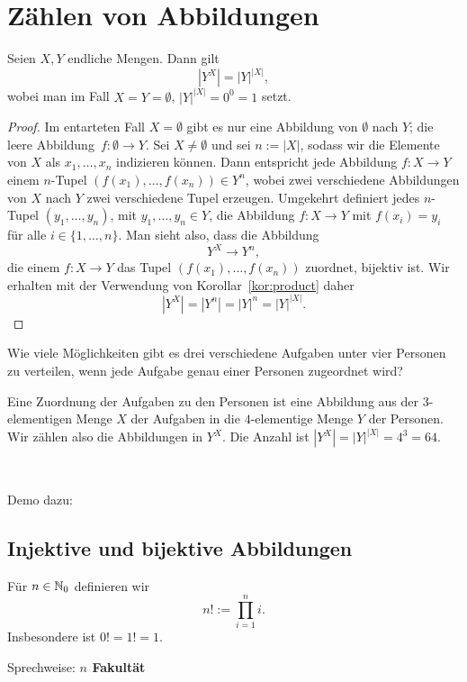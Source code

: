 \section{Zählen von Abbildungen} 

\begin{thm}
	Seien $X,Y $ endliche Mengen. Dann gilt
	\[
	|Y^X| = |Y|^{|X|},
	\]
	wobei man im Fall $X= Y = \emptyset$, $|Y|^{|X|} = 0^0 = 1$ setzt. 
\end{thm}
\begin{proof}
	Im entarteten Fall $X = \emptyset$ gibt es nur eine Abbildung von $\emptyset$ nach $Y$; die \glqq leere Abbildung\grqq\ $f : \emptyset \to Y$. 
	Sei $X \ne\emptyset$ und sei $n := |X|$, sodass wir die Elemente von $X$ als $x_1,\ldots,x_n$ indizieren können. Dann entspricht jede Abbildung $f : X \to Y$ einem $n$-Tupel $(f(x_1),\ldots,f(x_n)) \in Y^n$, wobei zwei verschiedene Abbildungen von $X$ nach $Y$ zwei verschiedene Tupel erzeugen. 
	Umgekehrt definiert jedes $n$-Tupel $(y_1,\ldots,y_n)$, mit $y_1,\ldots,y_n \in Y$, die Abbildung $f: X \to Y$ mit $f(x_i)  = y_i$ für alle $i \in \{1,\ldots,n\}$. Man sieht also, dass die Abbildung 
	\[
			Y^X \to Y^n,
	\]
	die einem $f : X \to Y$ das Tupel $(f(x_1),\ldots,f(x_n))$ zuordnet, bijektiv ist. Wir erhalten mit der Verwendung von Korollar~\ref{kor:product} daher
	\[
			|Y^X| = |Y^n| = |Y|^n = |Y|^{|X|}. 
	\]
\end{proof} 

\begin{bsp}
	Wie viele Möglichkeiten gibt es drei verschiedene Aufgaben unter vier Personen zu verteilen, wenn jede Aufgabe genau einer Personen zugeordnet wird? 
	
	Eine Zuordnung der Aufgaben zu den Personen ist eine Abbildung aus der $3$-elementigen Menge $X$ der Aufgaben in die $4$-elementige Menge $Y$ der Personen. Wir zählen also die Abbildungen in $Y^X$. Die Anzahl ist $|Y^X| = |Y|^{|X|} = 4^3 = 64$. 
\end{bsp} 

\begin{bem}\
	 
	Demo dazu: 
	
\end{bem}


\subsection{Injektive und bijektive Abbildungen} 

\begin{defn}[Fakultät]
	Für $n \in \mathbb{N}_0$ definieren wir 
	\[n ! := \prod_{i=1}^n i.
	\]
	Insbesondere ist $0!=1!=1$.
	
	Sprechweise: \glqq\textbf{$n$ Fakultät}\grqq
\end{defn} 

